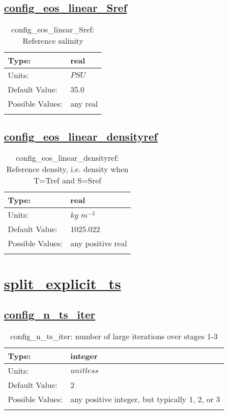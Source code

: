 \subsection[config\_eos\_linear\_Sref]{\hyperref[sec:nm_tab_eos_linear]{config\_eos\_linear\_Sref}}
\label{subsec:nm_sec_config_eos_linear_Sref}
\begin{center}
\begin{longtable}{| p{2.0in} | p{4.0in} |}
    \hline
    Type: & real \\
    \hline
    Units: & $PSU$ \\
    \hline
    Default Value: & 35.0 \\
    \hline
    Possible Values: & any real \\
    \hline
    \caption{config\_eos\_linear\_Sref: Reference salinity}
\end{longtable}
\end{center}
\subsection[config\_eos\_linear\_densityref]{\hyperref[sec:nm_tab_eos_linear]{config\_eos\_linear\_densityref}}
\label{subsec:nm_sec_config_eos_linear_densityref}
\begin{center}
\begin{longtable}{| p{2.0in} | p{4.0in} |}
    \hline
    Type: & real \\
    \hline
    Units: & $kg$ $m^{-3}$ \\
    \hline
    Default Value: & 1025.022 \\
    \hline
    Possible Values: & any positive real \\
    \hline
    \caption{config\_eos\_linear\_densityref: Reference density, i.e. density when T=Tref and S=Sref}
\end{longtable}
\end{center}
\section[split\_explicit\_ts]{\hyperref[sec:nm_tab_split_explicit_ts]{split\_explicit\_ts}}
\label{sec:nm_sec_split_explicit_ts}
\subsection[config\_n\_ts\_iter]{\hyperref[sec:nm_tab_split_explicit_ts]{config\_n\_ts\_iter}}
\label{subsec:nm_sec_config_n_ts_iter}
\begin{center}
\begin{longtable}{| p{2.0in} | p{4.0in} |}
    \hline
    Type: & integer \\
    \hline
    Units: & $unitless$ \\
    \hline
    Default Value: & 2 \\
    \hline
    Possible Values: & any positive integer, but typically 1, 2, or 3 \\
    \hline
    \caption{config\_n\_ts\_iter: number of large iterations over stages 1-3}
\end{longtable}
\end{center}
